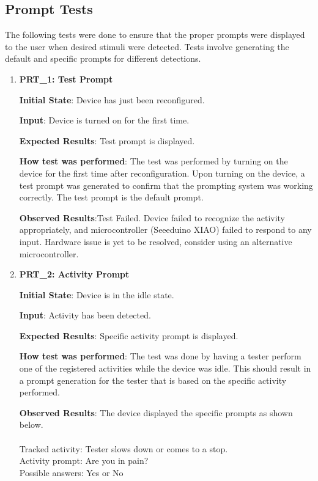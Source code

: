 \documentclass[12pt, titlepage]{article}
\begin{document}
\subsection{Prompt Tests}

The following tests were done to ensure that the proper prompts were displayed to the user when desired stimuli were detected. Tests involve generating the default and specific prompts for different detections.

\begin{enumerate}
  \item{\textbf{PRT\_1: Test Prompt} \\}\label{PRT1}

  \textbf{Initial State}: Device has just been reconfigured.

  \textbf{Input}: Device is turned on for the first time.

  \textbf{Expected Results}: Test prompt is displayed.

  \textbf{How test was performed}: The test was performed by turning on the device for the first time after reconfiguration. Upon turning on the device, a test prompt was generated to confirm that the prompting system was working correctly. The test prompt is the default prompt.

  \textbf{Observed Results}:Test Failed. Device failed to recognize the activity appropriately, and microcontroller (Seeeduino XIAO) failed to respond to any input. Hardware issue is yet to be resolved, consider using an alternative microcontroller.

  \item{\textbf{PRT\_2: Activity Prompt} \\}\label{PRT2}

  \textbf{Initial State}: Device is in the idle state.

  \textbf{Input}: Activity has been detected.

  \textbf{Expected Results}: Specific activity prompt is displayed.

  \textbf{How test was performed}: The test was done by having a tester perform one of the registered activities while the device was idle. This should result in a prompt generation for the tester that is based on the specific activity performed.

  \textbf{Observed Results}: The device displayed the specific prompts as shown below.\\\\
  Tracked activity: Tester slows down or comes to a stop.\\
  Activity prompt: Are you in pain?\\
  Possible answers: Yes or No

\end{enumerate}
\end{document}
